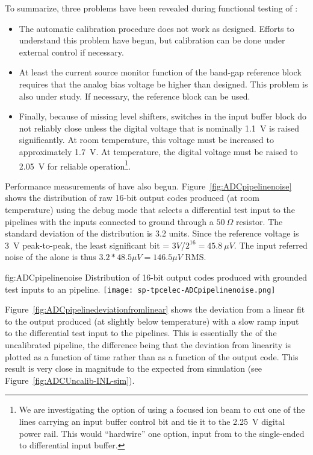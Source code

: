 To summarize, three problems have been revealed during functional testing of :
\begin{itemize}
\item The automatic calibration procedure does not work as designed.  Efforts to understand this problem have
begun, but calibration can be done under external control if necessary.
\item At least the current source monitor function of the band-gap reference block requires that the analog bias
voltage be higher than designed.  This problem is also under study.  If necessary, the  reference
block can be used.
\item Finally, because of missing level shifters, switches in the input buffer block do not reliably close
unless the digital voltage that is nominally \SI{1.1}{V} is raised significantly.  At room temperature, this
voltage must be increased to approximately \SI{1.7}{V}.  At \lntwo temperature, the digital voltage must be
raised to \SI{2.05}{V} for reliable operation\footnote{We are investigating the option of using a focused ion
beam to cut one of the lines carrying an input buffer control bit and tie it to the \SI{2.25}{V} digital
power rail.  This would ``hardwire'' one option, input from  to the single-ended to differential
input buffer.}.
\end{itemize}

Performance measurements of  have also begun.  Figure~\ref{fig:ADCpipelinenoise} shows the
distribution of raw 16-bit output codes produced (at room temperature) using the debug mode that selects a
differential test input to the pipelines with the inputs connected to ground through a $\SI{50}{\Omega}$
resistor.  The standard deviation of the distribution is 3.2 units.  Since the reference voltage is \SI{3}{V}
peak-to-peak, the least significant bit = $3V$/${2^{16}} = \SI{45.8}{\mu V}$. The input referred noise of the
 alone is thus $3.2 * 48.5 \mu V = 146.5 \mu V$ RMS.

\begin{dunefigure}
{fig:ADCpipelinenoise}
{Distribution of 16-bit output codes produced with grounded test inputs to an  pipeline.}
\texttt{[image: sp-tpcelec-ADCpipelinenoise.png]}
\end{dunefigure}

Figure~\ref{fig:ADCpipelinedeviationfromlinear} shows the deviation from a linear fit to the 
output produced (at slightly below \lntwo temperature) with a slow ramp input to the differential test
input to the  pipelines.  This is essentially the  of the uncalibrated
pipeline, the difference being that the deviation from linearity is plotted as a function of time rather than
as a function of the  output code.  This result is very close in magnitude to the  expected from
simulation (see Figure~\ref{fig:ADCUncalib-INL-sim}).

